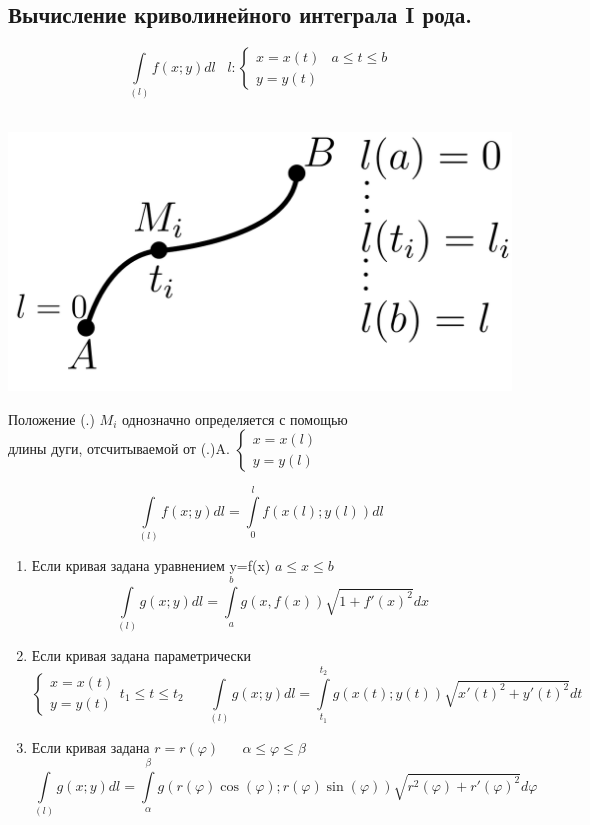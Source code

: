 \documentclass[12pt]{article}
\let\ORIincludegraphics\includegraphics
\renewcommand{\includegraphics}[2][]{\ORIincludegraphics[scale=0.65,#1]{#2}}
\let\oldint\int
\renewcommand{\int}{\oldint\limits}
\begin{document}
  \subsection{Вычисление криволинейного интеграла I рода.}
  \[\int_{(l)} f(x;y) dl \hspace{10pt} l: \begin{cases}
    x=x(t) & a\leq t\leq b\\
    y=y(t)
  \end{cases}\] \\
  \begin{minipage}{0.45\textwidth}
    \includegraphics[scale=0.4]{8.2.1.png}
  \end{minipage}
  \hspace{1em}
  \begin{minipage}{0.65\textwidth}
    Положение (.) $M_i$ однозначно определяется с помощью \\
    длины дуги, отсчитываемой от (.)A. $\begin{cases}
      x=x(l)\\
      y=y(l)
    \end{cases}$
  \end{minipage}
  \vspace{1em}
  \par
  \[\int_{(l)}f(x;y)dl=\int_{0}^{l} f(x(l);y(l))dl\]
  \begin{enumerate}
    \item Если кривая задана уравнением y=f(x) $a \leq x \leq b$\\
    \[  \int_{(l)}g(x;y)dl=\int_{a}^{b}g(x,f(x))\sqrt{1+f'(x)^2}dx\]
    \item Если кривая задана параметрически\\
    \[\begin{cases}
      x=x(t)\\
      y=y(t)
    \end{cases} t_1 \leq t \leq t_2 \hspace{20pt} \int_{(l)}g(x;y)dl=\int_{t_1}^{t_2}g(x(t);y(t))
    \sqrt{x'(t)^2+y'(t)^2}dt\]
    \item Если кривая задана $r=r(\varphi) \hspace{20pt} \alpha \leq \varphi \leq \beta$\\
    \[\int_{(l)}g(x;y)dl = \int_{\alpha}^{\beta} g(r(\varphi)\cos(\varphi);r(\varphi)\sin(\varphi))
    \sqrt{r^2(\varphi)+r'(\varphi)^2}d\varphi\]
  \end{enumerate}
\end{document}
